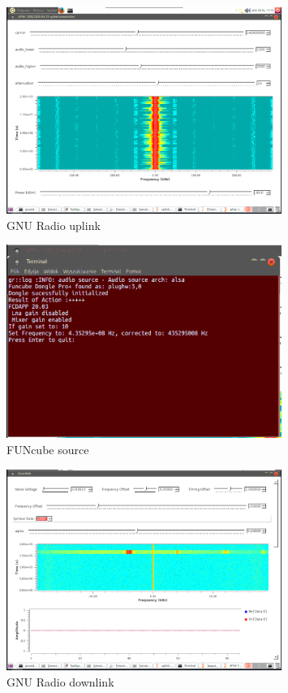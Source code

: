 \begin{figure}
	\includegraphics[width=0.8\textwidth]{gs/img/uplink.png}
	\caption{\label{fig:gs:uplink} GNU Radio uplink}
\end{figure}

\begin{figure}
	\includegraphics[width=0.8\textwidth]{gs/img/fcd-source.png}
	\caption{\label{fig:gs:fcd_source} FUNcube source}
\end{figure}

\begin{figure}
	\includegraphics[width=0.8\textwidth]{gs/img/downlink.png}
	\caption{\label{fig:gs:downlink} GNU Radio downlink}
\end{figure}

